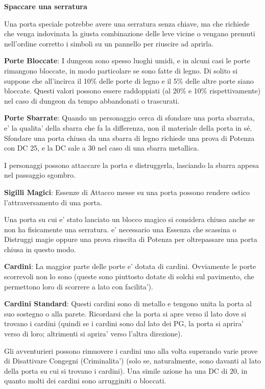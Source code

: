 \documentclass[a4paper,11pt,twoside,openany]{book}
\begin{document}
{		\textbf{Spaccare una serratura}
		
		Una porta speciale potrebbe avere una serratura senza chiave, ma che richiede che venga indovinata la giusta combinazione delle leve vicine o vengano premuti nell'ordine corretto i simboli su un pannello per riuscire ad aprirla.
		
		\textbf{Porte Bloccate}: I dungeon sono spesso luoghi umidi, e in alcuni casi le porte rimangono bloccate, in modo particolare se sono fatte di legno. Di solito si suppone che all'incirca il 10\% delle porte di legno e il 5\% delle altre porte siano bloccate. Questi valori possono essere raddoppiati (al 20\% e 10\% rispettivamente) nel caso di dungeon da tempo abbandonati o trascurati.
		
		\textbf{Porte Sbarrate}: Quando un personaggio cerca di sfondare una porta sbarrata, e' la qualita' della sbarra che fa la differenza, non il materiale della porta in sé. Sfondare una porta chiusa da una sbarra di legno richiede una prova di Potenza con DC 25, e la DC sale a 30 nel caso di una sbarra metallica.
		
		I personaggi possono attaccare la porta e distruggerla, lasciando la sbarra appesa nel passaggio sgombro.
		
		\textbf{Sigilli Magici}: Essenze di Attacco messe su una porta possono rendere ostico l'attraversamento di una porta.
		
		Una porta su cui e' stato lanciato un blocco magico si considera chiusa anche se non ha fisicamente una serratura. e' necessario una Essenza che scassina o Distruggi magie oppure una prova riuscita di Potenza per oltrepassare una porta chiusa in questo modo.
		
		\textbf{Cardini}: La maggior parte delle porte e' dotata di cardini. Ovviamente le porte scorrevoli non lo sono (queste sono piuttosto dotate di solchi sul pavimento, che permettono loro di scorrere a lato con facilita').
		
		\textbf{Cardini Standard}: Questi cardini sono di metallo e tengono unita la porta al suo sostegno o alla parete. Ricordarsi che la porta si apre verso il lato dove si trovano i cardini (quindi se i cardini sono dal lato dei PG, la porta si aprira' verso di loro; altrimenti si aprira' verso l’altra direzione). 
		
		Gli avventurieri possono rimuovere i cardini uno alla volta superando varie prove di Disattivare Congegni (Criminalita') (solo se, naturalmente, sono davanti al lato della porta su cui si trovano i cardini). Una simile azione ha una DC di 20, in quanto molti dei cardini sono arrugginiti o bloccati. 
		
}
\end{document}

